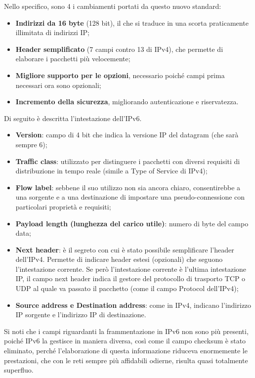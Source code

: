 \documentclass{article}
\begin{document}
            Nello specifico, sono 4 i cambiamenti portati da questo nuovo standard:
            \begin{itemize}
                \item \textbf{Indirizzi da 16 byte} (128 bit), il che si traduce in una scorta praticamente illimitata di
                indirizzi IP;
                \item \textbf{Header semplificato} (7 campi contro 13 di IPv4), che permette di elaborare i pacchetti
                più velocemente;
                \item \textbf{Migliore supporto per le opzioni}, necessario poiché campi prima necessari ora sono
                opzionali;
                \item \textbf{Incremento della sicurezza}, migliorando autenticazione e riservatezza.                
            \end{itemize}
            Di seguito è descritta l’intestazione dell’IPv6.

            
            \begin{itemize}
                \item \textbf{Version}: campo di 4 bit che indica la versione IP del datagram (che sarà sempre 6);
                \item \textbf{Traffic class}: utilizzato per distinguere i pacchetti con diversi requisiti di distribuzione
                in tempo reale (simile a Type of Service di IPv4);
                \item \textbf{Flow label}: sebbene il suo utilizzo non sia ancora chiaro, consentirebbe a una sorgente e
                a una destinazione di impostare una pseudo-connessione con particolari proprietà e
                requisiti;
                \item \textbf{Payload length (lunghezza del carico utile)}: numero di byte del campo data;
                \item \textbf{Next header}: è il segreto con cui è stato possibile semplificare l’header dell’IPv4.
                Permette di indicare header estesi (opzionali) che seguono l’intestazione corrente. Se
                però l’intestazione corrente è l’ultima intestazione IP, il campo next header indica il
                gestore del protocollo di trasporto TCP o UDP al quale va passato il pacchetto (come il
                campo Protocol dell’IPv4);
                \item \textbf{Source address e Destination address}: come in IPv4, indicano l’indirizzo IP sorgente e
                l’indirizzo IP di destinazione.
                
            \end{itemize}
            Si noti che i campi riguardanti la frammentazione in IPv6 non sono più presenti, poiché IPv6
            la gestisce in maniera diversa, così come il campo checksum è stato eliminato, perché
            l’elaborazione di questa informazione riduceva enormemente le prestazioni, che con le reti
            sempre più affidabili odierne, risulta quasi totalmente superfluo.
\end{document}
